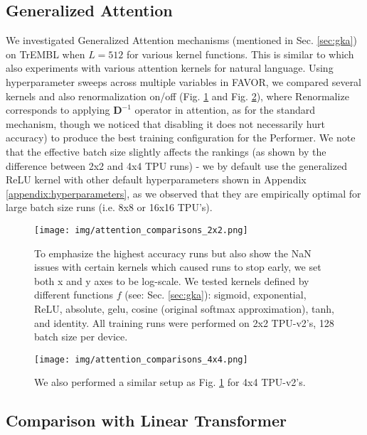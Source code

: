 \subsection{Generalized Attention}
\label{subsec:appendix_generalized_attention}
We investigated Generalized Attention mechanisms (mentioned in Sec. \ref{sec:gka}) on TrEMBL when $L=512$ for various kernel functions. This is similar to \citep{tsai2019transformer} which also experiments with various attention kernels for natural language. Using hyperparameter sweeps across multiple variables in FAVOR, we compared several kernels and also renormalization on/off (Fig. \ref{fig:attention_comparisons_2x2} and Fig. \ref{fig:attention_comparisons_4x4}), where $\mathrm{Renormalize}$ corresponds to applying $\mathbf{D}^{-1}$ operator in attention, as for the standard mechanism, though we noticed that disabling it does not necessarily hurt accuracy) to produce the best training configuration for the Performer. We note that the effective batch size slightly affects the rankings (as shown by the difference between 2x2 and 4x4 TPU runs) - we by default use the generalized ReLU kernel with other default hyperparameters shown in Appendix \ref{appendix:hyperparameters}, as we observed that they are empirically optimal for large batch size runs (i.e. 8x8 or 16x16 TPU's).

\begin{figure}[h]
  \centering
  \texttt{[image: img/attention\_comparisons\_2x2.png]}
  \caption{To emphasize the highest accuracy runs but also show the NaN issues with certain kernels which caused runs to stop early, we set both x and y axes to be log-scale. We tested kernels defined by different functions $f$ (see: Sec. \ref{sec:gka}): sigmoid, exponential, ReLU, absolute, gelu, cosine (original softmax approximation), tanh, and identity. All training runs were performed on 2x2 TPU-v2's, 128 batch size per device.}
  \label{fig:attention_comparisons_2x2}
\end{figure}

\begin{figure}[h]
  \centering
  \texttt{[image: img/attention\_comparisons\_4x4.png]}
  \caption{We also performed a similar setup as Fig. \ref{fig:attention_comparisons_2x2} for 4x4 TPU-v2's.}
  \label{fig:attention_comparisons_4x4}
\end{figure}

\subsection{Comparison with Linear Transformer}
\label{appendix:linear_transformer}

